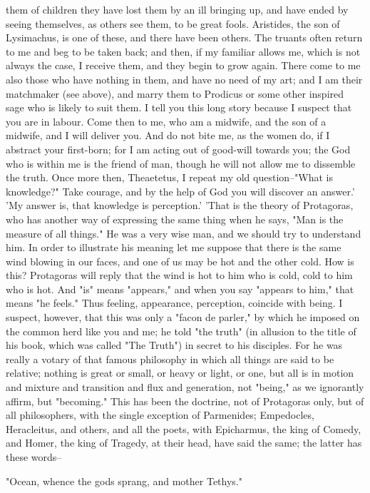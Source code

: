 them of children they have lost them by an ill bringing up, and have
ended by seeing themselves, as others see them, to be great fools.
Aristides, the son of Lysimachus, is one of these, and there have been
others. The truants often return to me and beg to be taken back; and
then, if my familiar allows me, which is not always the case, I receive
them, and they begin to grow again. There come to me also those who have
nothing in them, and have no need of my art; and I am their matchmaker
(see above), and marry them to Prodicus or some other inspired sage who
is likely to suit them. I tell you this long story because I suspect
that you are in labour. Come then to me, who am a midwife, and the son
of a midwife, and I will deliver you. And do not bite me, as the women
do, if I abstract your first-born; for I am acting out of good-will
towards you; the God who is within me is the friend of man, though he
will not allow me to dissemble the truth. Once more then, Theaetetus,
I repeat my old question--"What is knowledge?" Take courage, and by the
help of God you will discover an answer.' 'My answer is, that knowledge
is perception.' 'That is the theory of Protagoras, who has another way
of expressing the same thing when he says, "Man is the measure of all
things." He was a very wise man, and we should try to understand him.
In order to illustrate his meaning let me suppose that there is the same
wind blowing in our faces, and one of us may be hot and the other cold.
How is this? Protagoras will reply that the wind is hot to him who is
cold, cold to him who is hot. And "is" means "appears," and when you
say "appears to him," that means "he feels." Thus feeling, appearance,
perception, coincide with being. I suspect, however, that this was only
a "facon de parler," by which he imposed on the common herd like you and
me; he told "the truth" (in allusion to the title of his book, which
was called "The Truth") in secret to his disciples. For he was really
a votary of that famous philosophy in which all things are said to be
relative; nothing is great or small, or heavy or light, or one, but all
is in motion and mixture and transition and flux and generation, not
"being," as we ignorantly affirm, but "becoming." This has been the
doctrine, not of Protagoras only, but of all philosophers, with the
single exception of Parmenides; Empedocles, Heracleitus, and others, and
all the poets, with Epicharmus, the king of Comedy, and Homer, the king
of Tragedy, at their head, have said the same; the latter has these
words--

"Ocean, whence the gods sprang, and mother Tethys."

